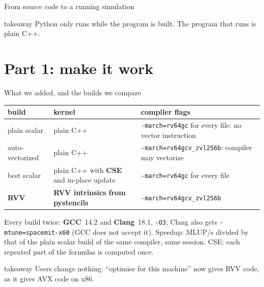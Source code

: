 \documentclass[aspectratio=169,10pt,t]{beamer}
\newcommand{\term}[1]{\textcolor{psblue!85!black}{\textbf{#1}}} %
\newcommand{\code}[1]{\texttt{#1}}
\newcommand{\takeaway}[1]{\par\vfill
  \begin{beamercolorbox}[wd=\textwidth,sep=4pt,rounded=true]{takeaway}
    \small #1
  \end{beamercolorbox}}
\begin{document}
\begin{frame}{From source code to a running simulation}
  \vspace{1mm}
  \centering
  \takeaway{Python only runs while the program is built. The program that runs is plain C++.}
\end{frame}

\section{Part 1: make it work}

\begin{frame}{What we added, and the builds we compare}
  \vspace{2mm}
  \centering

  \vspace{5mm}
  {\footnotesize\renewcommand{\arraystretch}{1.15}
  \begin{tabular}{@{}lll@{}}
    \toprule
    \textbf{build} & \textbf{kernel} & \textbf{compiler flags}\\
    \midrule
    plain scalar & plain C++ & \code{-march=rv64gc} for every file: no vector instruction\\
    auto-vectorized & plain C++ & \code{-march=rv64gcv\_zvl256b}: compiler may vectorize\\
    best scalar & plain C++ with \term{CSE} and in-place update & \code{-march=rv64gc} for every file\\
    \textbf{RVV} & \textbf{RVV intrinsics from pystencils} & \code{-march=rv64gcv\_zvl256b}\\
    \bottomrule
  \end{tabular}\par}

  \vspace{2mm}
  {\scriptsize\color{psgray}Every build twice: \term{GCC}~14.2 and \term{Clang}~18.1, \code{-O3}; Clang also
  gets \code{-mtune=spacemit-x60} (GCC does not accept it). Speedup: MLUP/s divided by that of the
  plain scalar build of the same compiler, same session. CSE: each repeated part of the formulas is
  computed once.\par}
  \takeaway{Users change nothing: ``optimise for this machine'' now gives RVV code, as it gives AVX
    code on x86.}
\end{frame}
\end{document}
